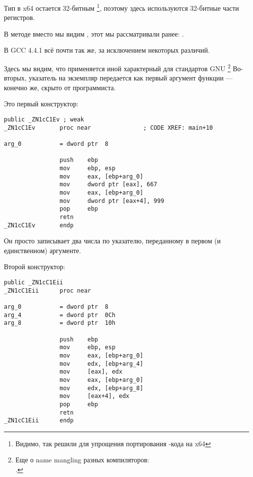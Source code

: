 

Тип \Tint в x64 остается 32-битным
\footnote{Видимо, так решили для упрощения портирования \CCpp{}-кода на x64}, 
поэтому здесь используются 32-битные части регистров.

В методе  вместо \RET мы видим , этот  мы рассматривали ранее: .


В GCC 4.4.1 всё почти так же, за исключением некоторых различий.



Здесь мы видим, что применяется иной  характерный для стандартов GNU
\footnote{Еще о name mangling разных компиляторов:\\
\InSqBrackets{\AgnerFogCC}.}
Во-вторых, указатель на экземпляр передается как первый аргумент функции --- конечно же, скрыто от программиста.

Это первый конструктор:

\begin{lstlisting}[style=customasmx86]
                public _ZN1cC1Ev ; weak
_ZN1cC1Ev       proc near               ; CODE XREF: main+10

arg_0           = dword ptr  8

                push    ebp
                mov     ebp, esp
                mov     eax, [ebp+arg_0]
                mov     dword ptr [eax], 667
                mov     eax, [ebp+arg_0]
                mov     dword ptr [eax+4], 999
                pop     ebp
                retn
_ZN1cC1Ev       endp
\end{lstlisting}

Он просто записывает два числа по указателю, переданному в первом (и единственном) аргументе.

Второй конструктор:

\begin{lstlisting}[style=customasmx86]
                public _ZN1cC1Eii
_ZN1cC1Eii      proc near

arg_0           = dword ptr  8
arg_4           = dword ptr  0Ch
arg_8           = dword ptr  10h

                push    ebp
                mov     ebp, esp
                mov     eax, [ebp+arg_0]
                mov     edx, [ebp+arg_4]
                mov     [eax], edx
                mov     eax, [ebp+arg_0]
                mov     edx, [ebp+arg_8]
                mov     [eax+4], edx
                pop     ebp
                retn
_ZN1cC1Eii      endp
\end{lstlisting}

